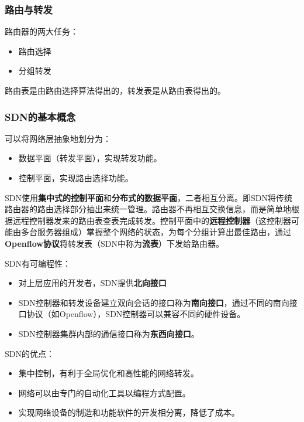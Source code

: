 \documentclass[12pt, a4paper, oneside]{ctexart}
\begin{document}
\subsubsection{路由与转发}

路由器的两大任务：
\begin{itemize}
    \item 路由选择
    \item 分组转发
\end{itemize}

路由表是由路由选择算法得出的，转发表是从路由表得出的。

\subsubsection{SDN的基本概念}

可以将网络层抽象地划分为：
\begin{itemize}
    \item 数据平面（转发平面），实现转发功能。
    \item 控制平面，实现路由选择功能。
\end{itemize}

SDN使用\textbf{集中式的控制平面}和\textbf{分布式的数据平面}，二者相互分离。即SDN将传统路由器的路由选择部分抽出来统一管理。路由器不再相互交换信息，而是简单地根据远程控制器发来的路由表查表完成转发。控制平面中的\textbf{远程控制器}（这控制器可能由多台服务器组成）掌握整个网络的状态，为每个分组计算出最佳路由，通过\textbf{Openflow协议}将转发表（SDN中称为\textbf{流表}）下发给路由器。

SDN有可编程性：
\begin{itemize}
    \item 对上层应用的开发者，SDN提供\textbf{北向接口}
    \item SDN控制器和转发设备建立双向会话的接口称为\textbf{南向接口}，通过不同的南向接口协议（如Openflow），SDN控制器可以兼容不同的硬件设备。
    \item SDN控制器集群内部的通信接口称为\textbf{东西向接口}。
\end{itemize}

SDN的优点：
\begin{itemize}
    \item 集中控制，有利于全局优化和高性能的网络转发。
    \item 网络可以由专门的自动化工具以编程方式配置。
    \item 实现网络设备的制造和功能软件的开发相分离，降低了成本。
\end{itemize}
\end{document}
